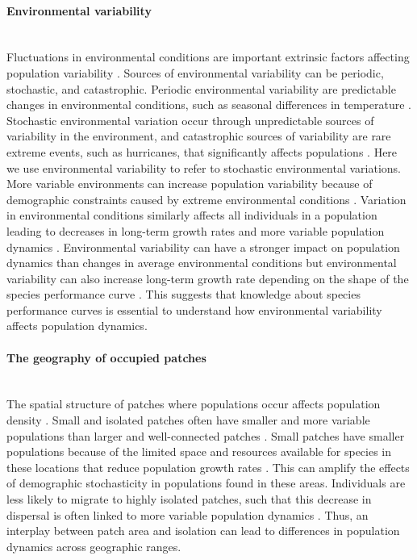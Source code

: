 \paragraph*{Environmental variability}\mbox{}\\ 
Fluctuations in environmental conditions are important extrinsic factors affecting population variability \parencite{bjornstad2001,melbourne2008}. Sources of environmental variability can be periodic, stochastic, and catastrophic. Periodic environmental variability are predictable changes in environmental conditions, such as seasonal differences in temperature \parencite{sabo2008}. Stochastic environmental variation occur through unpredictable sources of variability in the environment, and catastrophic sources of variability are rare extreme events, such as hurricanes, that significantly affects populations \parencite{sabo2008}. Here we use environmental variability to refer to stochastic environmental variations. More variable environments can increase population variability because of demographic constraints caused by extreme environmental conditions \parencite{bjornstad2001, boyce2006}. Variation in environmental conditions similarly affects all individuals in a population leading to decreases in long-term growth rates and more variable population dynamics \parencite{lewontin1969, melbourne2008, dee2020}. Environmental variability can have a stronger impact on population dynamics than changes in average environmental conditions \parencite{ruel1999,vasseur2014} but environmental variability can also increase long-term growth rate depending on the shape of the species performance curve \parencite{lawson2015}. This suggests that knowledge about species performance curves is essential to understand how environmental variability affects population dynamics.



\paragraph*{The geography of occupied patches}\mbox{}\\ 
The spatial structure of patches where populations occur affects population density \parencite{munguia2014}. Small and isolated patches often have smaller and more variable populations than larger and well-connected patches \parencite{taylor1990}. Small patches have smaller populations because of the limited space and resources available for species in these locations that reduce population growth rates \parencite{connor2000, hokit2003, londono2007}. This can amplify the effects of demographic stochasticity in populations found in these areas. Individuals are less likely to migrate to highly isolated patches, such that this decrease in dispersal is often linked to more variable population dynamics \parencite{hanski1998, abbott2011}. Thus, an interplay between patch area and isolation can lead to differences in population dynamics across geographic ranges.


